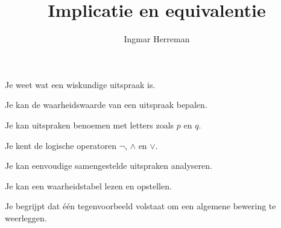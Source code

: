 \documentclass{ximera}
\title{Implicatie en equivalentie}
\author{Ingmar Herreman}
\begin{document}



\maketitle



\begin{voorkennis}

  \item Je weet wat een wiskundige uitspraak is.

  \item Je kan de waarheidswaarde van een uitspraak bepalen.

  \item Je kan uitspraken benoemen met letters zoals $p$ en $q$.

  \item Je kent de logische operatoren
        $\neg$, $\land$ en $\lor$.

  \item Je kan eenvoudige samengestelde uitspraken analyseren.

  \item Je kan een waarheidstabel lezen en opstellen.

  \item Je begrijpt dat één tegenvoorbeeld volstaat om een algemene
        bewering te weerleggen.

\end{voorkennis}


\end{document}
